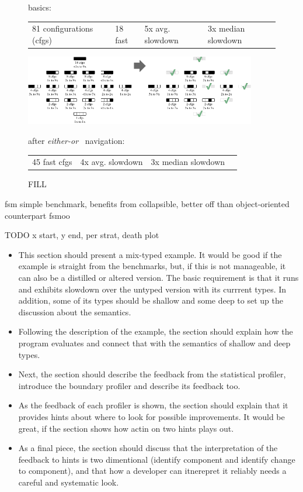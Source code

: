 \begin{figure}[t]

     basics:
    \begin{tabular}{llll}
      81 configurations (cfgs) &
      18 fast &
      5x avg. slowdown &
      3x median slowdown
    \end{tabular}

    \bigskip

    \includegraphics[width=0.9\textwidth]{data/fsm-lattice.pdf}

    after \emph{either-or}~\cite{g-deep-shallow} navigation:
    \begin{tabular}{llll}
      45 fast cfgs &
      4x avg. slowdown &
      3x median slowdown
    \end{tabular}

  \caption{FILL}
  \label{f:fsm-seascape}
\end{figure}

fsm simple benchmark,
benefits from collapsible, better off than object-oriented counterpart fsmoo



TODO x start, y end, per strat, death plot

\begin{itemize}
  \item This section should present a mix-typed example. It would be good
    if the example is straight from the benchmarks, but, if this is not
    manageable, it can also be a distilled or altered version.  The basic
    requirement is that it runs and exhibits slowdown over the untyped
    version with its currrent types. In addition, some of its types should
    be shallow and some deep to set up the discussion about the
    semantics.
  \item Following the description of the example,  
    the section should explain how the program evaluates and connect that with the
    semantics of shallow and deep types. 
  \item Next, the section should describe the feedback from the statistical
    profiler, introduce the boundary profiler  and 
    describe its feedback too. 
  \item As the feedback of each profiler is shown, the section should 
    explain that it provides hints about where to look for
    possible improvements. It would be great, if the section shows how
    actin on two hints plays out.  
  \item As a final piece, the section should discuss that the
    interpretation
    of the feedback to hints is two dimentional (identify component and
    identify change to component), and that how a developer can itnerepret
    it reliably needs a careful and systematic look.
\end{itemize}


